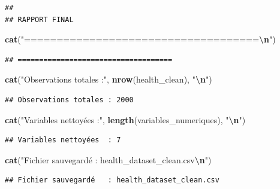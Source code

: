 \documentclass[
]{article}
\newenvironment{Shaded}{\begin{snugshade}}{\end{snugshade}}
\newcommand{\FunctionTok}[1]{\textcolor[rgb]{0.13,0.29,0.53}{\textbf{#1}}}
\newcommand{\NormalTok}[1]{#1}
\newcommand{\SpecialCharTok}[1]{\textcolor[rgb]{0.81,0.36,0.00}{\textbf{#1}}}
\newcommand{\StringTok}[1]{\textcolor[rgb]{0.31,0.60,0.02}{#1}}
\begin{document}
\begin{verbatim}
## 
## RAPPORT FINAL
\end{verbatim}

\begin{Shaded}
\begin{Highlighting}[]
\FunctionTok{cat}\NormalTok{(}\StringTok{"====================================}\SpecialCharTok{\textbackslash{}n}\StringTok{"}\NormalTok{)}
\end{Highlighting}
\end{Shaded}

\begin{verbatim}
## ====================================
\end{verbatim}

\begin{Shaded}
\begin{Highlighting}[]
\FunctionTok{cat}\NormalTok{(}\StringTok{"Observations totales :"}\NormalTok{, }\FunctionTok{nrow}\NormalTok{(health\_clean), }\StringTok{"}\SpecialCharTok{\textbackslash{}n}\StringTok{"}\NormalTok{)}
\end{Highlighting}
\end{Shaded}

\begin{verbatim}
## Observations totales : 2000
\end{verbatim}

\begin{Shaded}
\begin{Highlighting}[]
\FunctionTok{cat}\NormalTok{(}\StringTok{"Variables nettoyées  :"}\NormalTok{, }\FunctionTok{length}\NormalTok{(variables\_numeriques), }\StringTok{"}\SpecialCharTok{\textbackslash{}n}\StringTok{"}\NormalTok{)}
\end{Highlighting}
\end{Shaded}

\begin{verbatim}
## Variables nettoyées  : 7
\end{verbatim}

\begin{Shaded}
\begin{Highlighting}[]
\FunctionTok{cat}\NormalTok{(}\StringTok{"Fichier sauvegardé   : health\_dataset\_clean.csv}\SpecialCharTok{\textbackslash{}n}\StringTok{"}\NormalTok{)}
\end{Highlighting}
\end{Shaded}

\begin{verbatim}
## Fichier sauvegardé   : health_dataset_clean.csv
\end{verbatim}
\end{document}
